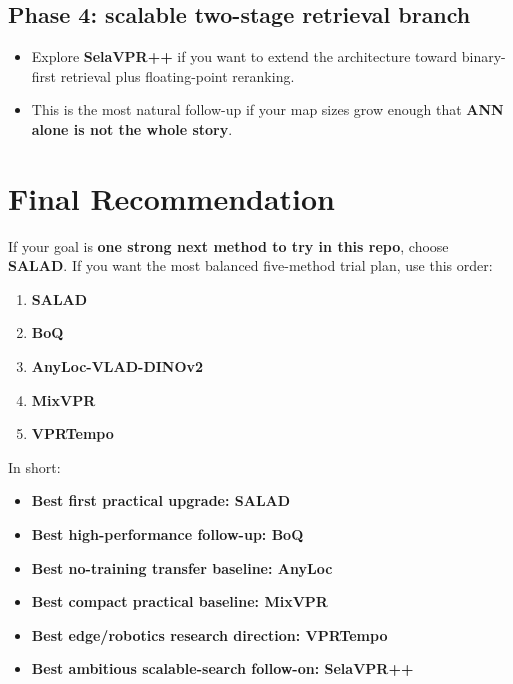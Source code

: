 \documentclass[11pt]{article}
\begin{document}
\subsection*{Phase 4: scalable two-stage retrieval branch}
\begin{itemize}[leftmargin=*]
  \item Explore \textbf{SelaVPR++} if you want to extend the architecture toward binary-first retrieval plus floating-point reranking.
  \item This is the most natural follow-up if your map sizes grow enough that \textbf{ANN alone is not the whole story}.
\end{itemize}

\section*{Final Recommendation}
If your goal is \textbf{one strong next method to try in this repo}, choose \textbf{SALAD}. If you want the most balanced five-method trial plan, use this order:
\begin{enumerate}[leftmargin=*]
  \item \textbf{SALAD}
  \item \textbf{BoQ}
  \item \textbf{AnyLoc-VLAD-DINOv2}
  \item \textbf{MixVPR}
  \item \textbf{VPRTempo}
\end{enumerate}

In short:
\begin{itemize}[leftmargin=*]
  \item \textbf{Best first practical upgrade: SALAD}
  \item \textbf{Best high-performance follow-up: BoQ}
  \item \textbf{Best no-training transfer baseline: AnyLoc}
  \item \textbf{Best compact practical baseline: MixVPR}
  \item \textbf{Best edge/robotics research direction: VPRTempo}
  \item \textbf{Best ambitious scalable-search follow-on: SelaVPR++}
\end{itemize}
\end{document}

